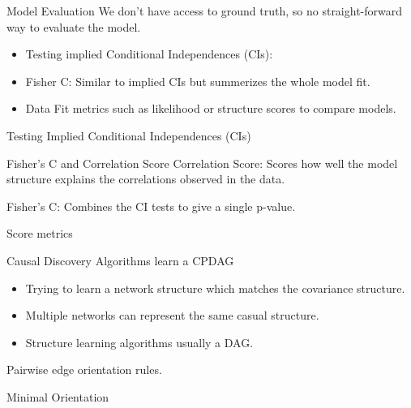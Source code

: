 \documentclass{beamer}
\begin{document}
\begin{frame}{Model Evaluation}
	We don't have access to ground truth, so no straight-forward way to evaluate the model.

	\begin{itemize}
		\item Testing implied Conditional Independences (CIs): 
		\item Fisher C: Similar to implied CIs but summerizes the whole model fit.
		\item Data Fit metrics such as likelihood or structure scores to compare models.
	\end{itemize}
\end{frame}

\begin{frame}{Testing Implied Conditional Independences (CIs)}
\end{frame}

\begin{frame}{Fisher's C and Correlation Score}
	Correlation Score: Scores how well the model structure explains the correlations 
	observed in the data.

	Fisher's C: Combines the CI tests to give a single p-value.
\end{frame}

\begin{frame}{Score metrics}
\end{frame}

\begin{frame}{Causal Discovery Algorithms learn a CPDAG}
	\begin{figure}
	\end{figure}
	
	\begin{itemize}
		\item Trying to learn a network structure which matches the covariance
			structure.
		\item Multiple networks can represent the same casual structure.
		\item Structure learning algorithms usually a DAG.
	\end{itemize}

	Pairwise edge orientation rules.
\end{frame}

\begin{frame}{Minimal Orientation}
\end{frame}
\end{document}
